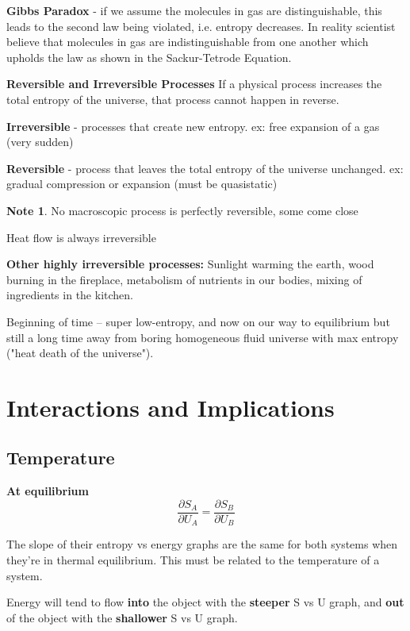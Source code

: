 \documentclass[11pt]{article}
\theoremstyle{definition}
\newtheorem{note}{Note}
\begin{document}
\textbf{Gibbs Paradox} - if we assume the molecules in gas are distinguishable, this leads to the second law being violated, i.e. entropy decreases. In reality scientist believe that molecules in gas are indistinguishable from one another which upholds the law as shown in the Sackur-Tetrode Equation.


\textbf{Reversible and Irreversible Processes}
If a physical process increases the total entropy of the universe, that process cannot happen in reverse.

\textbf{Irreversible} - processes that create new entropy. ex: free expansion of a gas (very sudden)

\textbf{Reversible} - process that leaves the total entropy of the universe unchanged. ex: gradual compression or expansion (must be quasistatic)

\begin{note}
No macroscopic process is perfectly reversible, some come close
\end{note}

Heat flow is always irreversible

\textbf{Other highly irreversible processes:} Sunlight warming the earth, wood burning in the fireplace, metabolism of nutrients in our bodies, mixing of ingredients in the kitchen.

Beginning of time -- super low-entropy, and now on our way to equilibrium but still a long time away from boring homogeneous fluid universe with max entropy ("heat death of the universe").

\section{Interactions and Implications}

\subsection{Temperature}

\textbf{At equilibrium}
\begin{equation}
\frac{\partial S_A}{\partial U_A} = \frac{\partial S_B}{\partial U_B}
\end{equation}

The slope of their entropy vs energy graphs are the same for both systems when they're in thermal equilibrium. This must be related to the temperature of a system.

Energy will tend to flow \textbf{into} the object with the \textbf{steeper} S vs U graph, and \textbf{out} of the object with the \textbf{shallower} S vs U graph.
\end{document}
